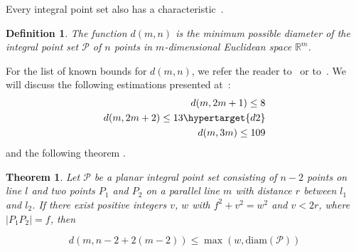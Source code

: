 \documentclass[12pt]{article}
\theoremstyle{theorem}
\newtheorem{theorem}{Theorem}
\theoremstyle{dfn}
\newtheorem{dfn}{Definition}
\theoremstyle{remark}
\begin{document}
Every integral point set also has a characteristic~\cite{kemnitz1988punktmengen,kurz2005characteristic}.

\begin{dfn}
	The function $d(m, n)$ is the minimum possible diameter of
	the integral point set $\mathcal{P}$ of $n$ points in
	$m$-dimensional Euclidean space $\mathbb{R}^{m}$.
\end{dfn}


%


For the list of known bounds for $d(m, n)$,
we refer the reader to~\cite[Theorem 1]{kurz2008bounds} or to~\cite{our-vmmsh-2018}.
We will discuss the following estimations presented at~\cite{kurz2008bounds}:
\begin{align}
	d(m, 2m + 1) \leq 8\\
	d(m, 2m + 2) \leq 13 \hypertarget{d2}\\
	d(m, 3m) \leq 109
\end{align}
and the following theorem \cite[Theorem 2.1]{kurz2008bounds}.

\begin{theorem}
	Let $\mathcal{P}$ be a planar integral point set consisting of
	$n - 2$ points on line $l$ and two points $P_{1}$ and $P_{2}$ on a
	parallel line $m$ with distance $r$ between $l_{1}$ and $l_{2}$. If there
	exist positive integers $v$, $w$ with $f^{2} + v^{2}
	= w^{2}$ and $v < 2r$, where $|P_{1}P_{2}| = f$,
	then

	\begin{equation}\label{formula1}
		d(m, n - 2 + 2(m - 2)) \leq \max(w, \operatorname{diam(\mathcal{P})})
	\end{equation}

\end{theorem}
\end{document}
